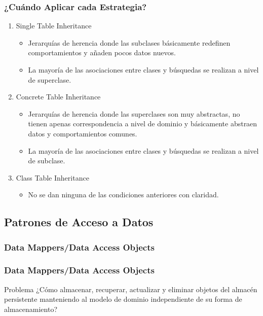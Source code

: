 \documentclass[a4paper,slidestop,xcolor=pst,dvips,blue]{beamer}
\begin{document}
\begin{frame}[c]
    \frametitle{¿Cuándo Aplicar cada Estrategia?}
    \begin{enumerate}
        \item<1-> Single Table Inheritance
            \begin{itemize}
                \item<2-> Jerarquías de herencia donde las subclases básicamente redefinen comportamientos y añaden pocos datos nuevos.
                \item<3-> La mayoría de las asociaciones entre clases y búsquedas se realizan a nivel de superclase.
            \end{itemize}
        \item<4-> Concrete Table Inheritance
            \begin{itemize}
                \item<5-> Jerarquías de herencia donde las superclases son muy abstractas, no tienen apenas correspondencia a nivel de dominio y básicamente abstraen datos y comportamientos comunes.
                \item<6-> La mayoría de las asociaciones entre clases y búsquedas se realizan a nivel de subclase.
            \end{itemize}
        \item<7-> Class Table Inheritance
            \begin{itemize}
                \item<8-> No se dan ninguna de las condiciones anteriores con claridad.
            \end{itemize}
    \end{enumerate}
\end{frame}

\subsection{Patrones de Acceso a Datos}

\subsubsection{Data Mappers/Data Access Objects}

\begin{frame}[c]
    \frametitle{Data Mappers/Data Access Objects}
    \begin{block}{Problema}
        ¿Cómo almacenar, recuperar, actualizar y eliminar objetos del almacén persistente manteniendo al modelo de dominio independiente de su forma de almacenamiento?
    \end{block}
\end{frame}
\end{document}
